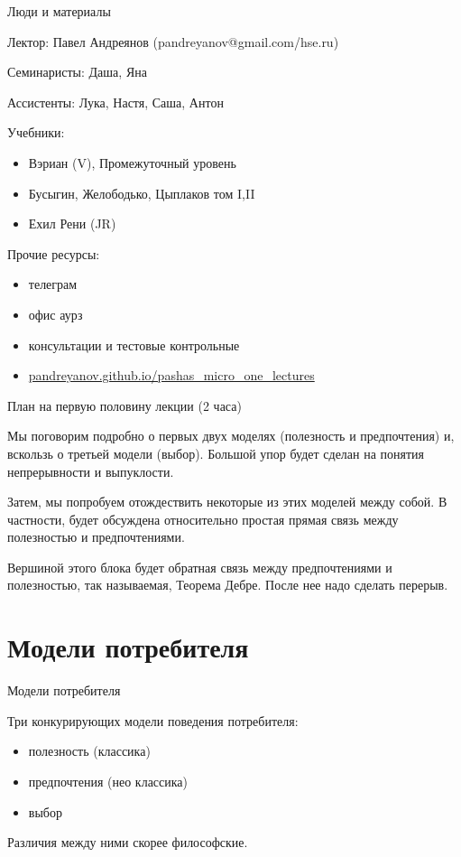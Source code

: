 \documentclass{beamer}
\begin{document}
\begin{frame}{Люди и материалы}

Лектор: Павел Андреянов (pandreyanov@gmail.com/hse.ru)

Семинаристы: Даша, Яна

Ассистенты: Лука, Настя, Саша, Антон

Учебники:
\begin{itemize}
\item Вэриан (V), Промежуточный уровень
\item Бусыгин, Желободько, Цыплаков том I,II
\item Ехил Рени (JR)
\end{itemize}

Прочие ресурсы:
\begin{itemize}
\item телеграм
\item офис аурз
\item консультации и тестовые контрольные
\item \url{pandreyanov.github.io/pashas_micro_one_lectures}
\end{itemize}

\end{frame}

\begin{frame}{План на первую половину лекции (2 часа)}

Мы поговорим подробно о первых двух моделях (полезность и предпочтения) и, вскользь о третьей модели (выбор). Большой упор будет сделан на понятия непрерывности и выпуклости.

Затем, мы попробуем отождествить некоторые из этих моделей между собой. В частности, будет обсуждена относительно простая прямая связь между полезностью и предпочтениями.

Вершиной этого блока будет обратная связь между предпочтениями и полезностью, так называемая, Теорема Дебре. После нее надо сделать перерыв.

\end{frame}

\section{Модели потребителя}

\begin{frame}{Модели потребителя}

Три конкурирующих модели поведения потребителя:

\begin{itemize}
\item полезность (классика)
\item предпочтения (нео классика)
\item выбор
\end{itemize}

Различия между ними скорее философские.

\end{frame}
\end{document}
